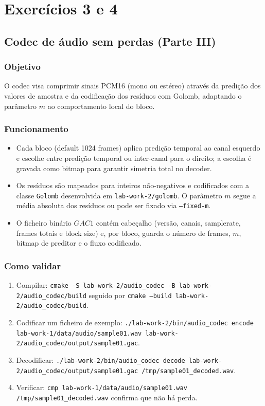 \chapter{Exercícios 3 e 4}

\section{Codec de áudio sem perdas (Parte III)}
\subsection{Objetivo}
O codec visa comprimir sinais PCM16 (mono ou estéreo) através da predição dos valores de amostra e da codificação dos resíduos com Golomb, adaptando o parâmetro \(m\) ao comportamento local do bloco.

\subsection{Funcionamento}
\begin{itemize}
  \item Cada bloco (default 1024 frames) aplica predição temporal ao canal esquerdo e escolhe entre predição temporal ou inter-canal para o direito; a escolha é gravada como bitmap para garantir simetria total no decoder.
  \item Os resíduos são mapeados para inteiros não-negativos e codificados com a classe \texttt{Golomb} desenvolvida em \texttt{lab-work-2/golomb}. O parâmetro \(m\) segue a média absoluta dos resíduos ou pode ser fixado via \texttt{--fixed-m}.
  \item O ficheiro binário \(GAC1\) contém cabeçalho (versão, canais, samplerate, frames totais e block size) e, por bloco, guarda o número de frames, \(m\), bitmap de preditor e o fluxo codificado.
\end{itemize}

\subsection{Como validar}
\begin{enumerate}
  \item Compilar: \texttt{cmake -S lab-work-2/audio_codec -B lab-work-2/audio_codec/build} seguido por \texttt{cmake --build lab-work-2/audio_codec/build}.
  \item Codificar um ficheiro de exemplo: \texttt{./lab-work-2/bin/audio_codec encode lab-work-1/data/audio/sample01.wav lab-work-2/audio_codec/output/sample01.gac}.
  \item Decodificar: \texttt{./lab-work-2/bin/audio_codec decode lab-work-2/audio_codec/output/sample01.gac /tmp/sample01\_decoded.wav}.
  \item Verificar: \texttt{cmp lab-work-1/data/audio/sample01.wav /tmp/sample01\_decoded.wav} confirma que não há perda.
\end{enumerate}


